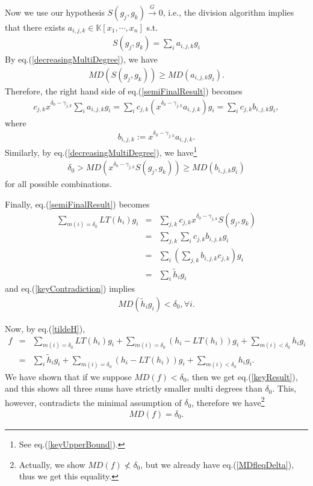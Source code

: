 \documentclass[11pt]{book}
\begin{document}
Now we use our hypothesis $S(g_j, g_k) \stackrel{G}{\to} 0$, i.e., the division algorithm implies that there exists $a_{i,j,k} \in \mathbb{K}[x_1, \cdots, x_n]$ s.t.
\begin{eqnarray}
S(g_j, g_k) = \sum_{i} a_{i,j,k} g_i
\end{eqnarray}
By eq.(\ref{decreasingMultiDegree}), we have
\begin{eqnarray}
\label{MDSgeqAG}
MD\left(S(g_j, g_k) \right) \geq MD( a_{i,j,k} g_i).
\end{eqnarray}
Therefore, the right hand side of eq.(\ref{semiFinalResult}) becomes
\begin{eqnarray}
c_{j,k} x^{\delta_0 - \gamma_{j,k}} \sum_{i} a_{i,j,k} g_i = \sum_i c_{j,k} (x^{\delta_0 - \gamma_{j,k}} a_{i,j,k}) g_i
= \sum_{i} c_{j,k} b_{i,j,k} g_i,
\end{eqnarray}
where
\begin{eqnarray}
b_{i,j,k} := x^{\delta_0 - \gamma_{j,k}} a_{i,j,k}.
\end{eqnarray}
Similarly, by eq.(\ref{decreasingMultiDegree}), we have\footnote{See eq.(\ref{keyUpperBound}).}
\begin{eqnarray}
\label{keyContradiction}
\delta_0 > MD \left( x^{\delta_0 - \gamma_{j,k}} S(g_j, g_k) \right) \geq MD( b_{i,j,k} g_i)
\end{eqnarray}
for all possible combinations.

Finally, eq.(\ref{semiFinalResult}) becomes
\begin{eqnarray}
\nonumber
\sum_{m(i) = \delta_0} LT(h_i) g_i &=& \sum_{j,k}c_{j,k} x^{\delta_0 - \gamma_{j,k}} S(g_j, g_k) \\
\nonumber
&=& \sum_{j,k} \sum_{i} c_{j,k} b_{i,j,k} g_i \\
&=& \sum_{i} \left( \sum_{j,k} b_{i,j,k} c_{j,k} \right) g_i \\
\label{tildeH}
&=& \sum_{i} \tilde{h}_i g_i 
\end{eqnarray}
and eq.(\ref{keyContradiction}) implies
\begin{eqnarray}
\label{keyResult}
MD(\tilde{h}_i g_i) < \delta_0, \forall i.
\end{eqnarray}

Now, by eq.(\ref{tildeH}),
\begin{eqnarray}
\nonumber
f &=& \sum_{m(i) = \delta_0} LT(h_i) g_i + \sum_{m(i) = \delta_0} \left(h_i - LT(h_i) \right) g_i + \sum_{m(i) < \delta_0} h_i g_i \\
&=& \sum_{i} \tilde{h}_i g_i  + \sum_{m(i) = \delta_0} \left(h_i - LT(h_i) \right) g_i + \sum_{m(i) < \delta_0} h_i g_i.
\end{eqnarray}
We have shown that if we suppose $MD(f) < \delta_0$, then we get eq.(\ref{keyResult}), and this shows all three sums have strictly smaller multi degrees than $\delta_0$.
This, however, contradicts the minimal assumption of $\delta_0$, therefore we have\footnote{Actually, we show $MD(f) \nless \delta_0$, but we already have eq.(\ref{MDfleqDelta}), thus we get this equality.}
\begin{eqnarray}
\label{equality}
MD(f) = \delta_0.
\end{eqnarray}
\end{document}
